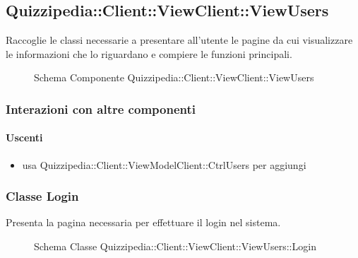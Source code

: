 \subsection{Quizzipedia::Client::ViewClient::ViewUsers}
Raccoglie le classi necessarie a presentare all'utente le pagine da cui visualizzare le informazioni che lo riguardano e compiere le funzioni principali.
\begin{figure}[H]
\centering
\noindent{}
\caption[Schema Componente Quizzipedia::Client::ViewClient::ViewUsers]{Schema Componente Quizzipedia::Client::ViewClient::ViewUsers}
\end{figure}
\subsubsection{Interazioni con altre componenti}
\paragraph{Uscenti}
\begin{itemize}
\item usa Quizzipedia::Client::ViewModelClient::CtrlUsers per aggiungi
\end{itemize}
\subsubsection{Classe Login}
Presenta la pagina necessaria per effettuare il login nel sistema.
\begin{figure}[H]
\centering
\noindent{}
\caption[Schema Classe Login]{Schema Classe Quizzipedia::Client::ViewClient::ViewUsers::Login}
\end{figure}
